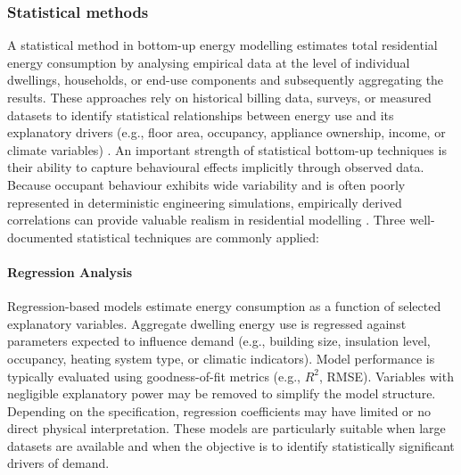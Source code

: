 \subsubsection*{Statistical methods}
A statistical method in bottom-up energy modelling estimates total residential energy consumption by analysing empirical data at the level of individual dwellings, households, or end-use components and subsequently aggregating the results. These approaches rely on historical billing data, surveys, or measured datasets to identify statistical relationships between energy use and its explanatory drivers (e.g., floor area, occupancy, appliance ownership, income, or climate variables) \cite{geraldiDatadrivenFrameworkRealistic2022}.
\newline An important strength of statistical bottom-up techniques is their ability to capture behavioural effects implicitly through observed data. Because occupant behaviour exhibits wide variability and is often poorly represented in deterministic engineering simulations, empirically derived correlations can provide valuable realism in residential modelling \cite{seryakOccupancyBehavioralAffects, emeryLongTermStudy2006}.
\newline Three well-documented statistical techniques \cite{swan_modeling_2009} are commonly applied:

\paragraph{Regression Analysis}
Regression-based models estimate energy consumption as a function of selected explanatory variables. Aggregate dwelling energy use is regressed against parameters expected to influence demand (e.g., building size, insulation level, occupancy, heating system type, or climatic indicators). Model performance is typically evaluated using goodness-of-fit metrics (e.g., $R^2$, RMSE). Variables with negligible explanatory power may be removed to simplify the model structure.
\newline Depending on the specification, regression coefficients may have limited or no direct physical interpretation. These models are particularly suitable when large datasets are available and when the objective is to identify statistically significant drivers of demand.

